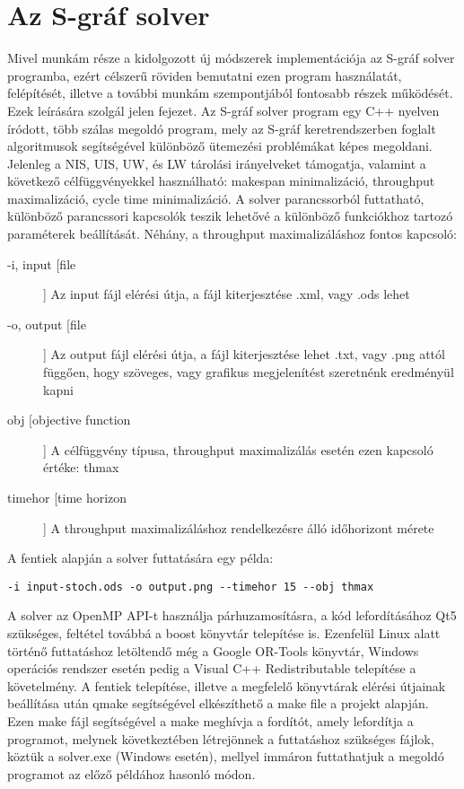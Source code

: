 \chapter{Az S-gráf solver} \label{s-graph_framework}
Mivel munkám része a kidolgozott új módszerek implementációja az S-gráf solver programba, ezért célszerű röviden bemutatni ezen program használatát, felépítését, illetve a további munkám szempontjából fontosabb részek működését.
Ezek leírására szolgál jelen fejezet.
Az S-gráf solver program egy C++ nyelven íródott, több szálas megoldó program, mely az S-gráf keretrendszerben foglalt algoritmusok segítségével különböző ütemezési problémákat képes megoldani.
Jelenleg a NIS, UIS, UW, és LW tárolási irányelveket támogatja, valamint a következő célfüggvényekkel használható: makespan minimalizáció, throughput maximalizáció, cycle time minimalizáció.
A solver parancssorból futtatható, különböző parancssori kapcsolók teszik lehetővé a különböző funkciókhoz tartozó paraméterek beállítását.
Néhány, a throughput maximalizáláshoz fontos kapcsoló:
\begin{description}
\item[-i, \text{-{}-}input [file]] Az input fájl elérési útja, a fájl kiterjesztése .xml, vagy .ods lehet
\item[-o, \text{-{}-}output [file]] Az output fájl elérési útja, a fájl kiterjesztése lehet .txt, vagy .png attól függően, hogy szöveges, vagy grafikus megjelenítést szeretnénk eredményül kapni
\item[\text{-{}-}obj [objective function]] A célfüggvény típusa, throughput maximalizálás esetén ezen kapcsoló értéke: thmax
\item[\text{-{}-}timehor [time horizon]] A throughput maximalizáláshoz rendelkezésre álló időhorizont mérete 
\end{description}
\pagebreak
A fentiek alapján a solver futtatására egy példa:
\begin{center}
\verb|-i input-stoch.ods -o output.png --timehor 15 --obj thmax|
\end{center}
A solver az OpenMP API-t használja párhuzamosításra, a kód lefordításához Qt5 szükséges, feltétel továbbá a boost könyvtár telepítése is.
Ezenfelül Linux alatt történő futtatáshoz letöltendő még a Google OR-Tools könyvtár, Windows operációs rendszer esetén pedig a Visual C++ Redistributable telepítése a követelmény.
A fentiek telepítése, illetve a megfelelő könyvtárak elérési útjainak beállítása után qmake segítségével elkészíthető a make file a projekt alapján.
Ezen make fájl segítségével a make meghívja a fordítót, amely lefordítja a programot, melynek következtében létrejönnek a futtatáshoz szükséges fájlok, köztük a solver.exe (Windows esetén), mellyel immáron futtathatjuk a megoldó programot az előző példához hasonló módon.   
